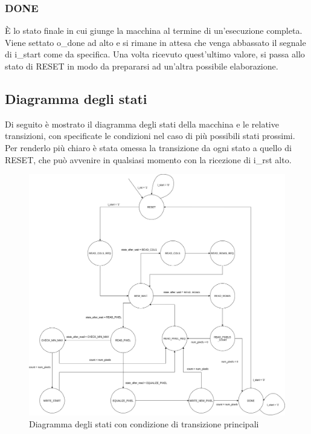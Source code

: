 \documentclass{article}
\begin{document}
\subsubsection{DONE}
È lo stato finale in cui giunge la macchina al termine di un'esecuzione completa. Viene settato o\_done ad alto e si rimane in attesa che venga abbassato il segnale di i\_start come da specifica. Una volta ricevuto quest'ultimo valore, si passa allo stato di RESET in modo da prepararsi ad un'altra possibile elaborazione.

\subsection{Diagramma degli stati}
Di seguito è mostrato il diagramma degli stati della macchina e le relative transizioni, con specificate le condizioni nel caso di più possibili stati prossimi. Per renderlo più chiaro è stata omessa la transizione da ogni stato a quello di RESET, che può avvenire in qualsiasi momento con la ricezione di i\_rst alto.

\begin{figure}[h]
    \includegraphics[width=\textwidth]{diagram.png}
    \centering
    \caption{Diagramma degli stati con condizione di transizione principali}
\end{figure}

\pagebreak

\end{document}
